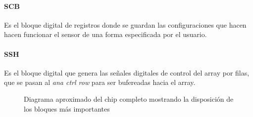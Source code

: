 \paragraph{SCB} Es el bloque digital de registros donde se guardan las configuraciones
que hacen hacen funcionar el sensor de una forma especificada por el usuario.

\paragraph{SSH} Es el bloque digital que genera las señales digitales de control
del array por filas, que se pasan al \textit{ana ctrl row} para ser bufereadas hacia el array.\\[1cm]

\begin{figure}[h]
	\centering
	
	\caption[Diagrama de bloques del chip completo]
	{Diagrama aproximado del chip completo mostrando la disposición de
	los bloques más importantes\protect\footnotemark }
	\label{fig:floorplan}
\end{figure}

